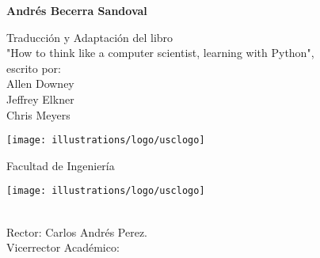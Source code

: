 \thispagestyle{empty} 

\vfill{}
\begin{center}
\textbf{\huge{}\introprog}
\par\end{center}{\huge \par}

\begin{center}
\vfill{}
\par\end{center}

\begin{center}
\textbf{\Large{}Andrés Becerra Sandoval}{\huge{} }
\par\end{center}{\huge \par}

\vfill{}
\begin{flushright}
{\small{}Traducción y Adaptación del libro }\\
{\small{}"How to think like a computer scientist, learning
with Python", }\\
{\small{} escrito por: }\\
{\small{} Allen Downey}\\
{\small{} Jeffrey Elkner}\\
{\small{} Chris Meyers}\\
{\small{} } 
\par\end{flushright}

\vfill{}
\begin{center}
\texttt{[image: illustrations/logo/usclogo]} 
\par\end{center}

\begin{center}
{\Large{}Facultad de Ingeniería} 
\par\end{center}

\vfill{}

\newpage{}

\thispagestyle{empty} \vfill{}
\texttt{[image: illustrations/logo/usclogo]} \\

\parindent0pt {\tiny{}\ }{\tiny \par}

{\scriptsize{}Rector: Carlos Andrés Perez.}\\
{\scriptsize{} Vicerrector Académico: }\\
{\scriptsize{} }{\scriptsize \par}

